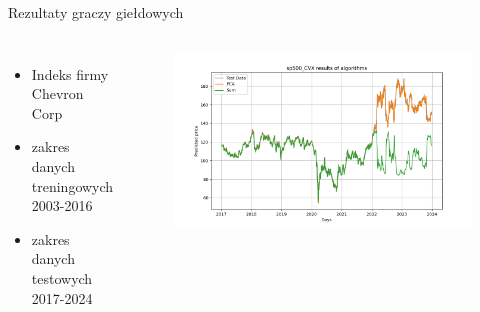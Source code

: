 \begin{frame}{Rezultaty graczy giełdowych}
    \begin{columns}[t]
            \begin{itemize}
                \item Indeks firmy Chevron Corp
                \item zakres danych treningowych 2003-2016
                \item zakres danych testowych 2017-2024
            \end{itemize}
        \centering
        \begin{figure}
            \centering
            \includegraphics[width=1\textwidth]{images/cvx_svm.png}
        \end{figure}    
    \end{columns}
\end{frame}
